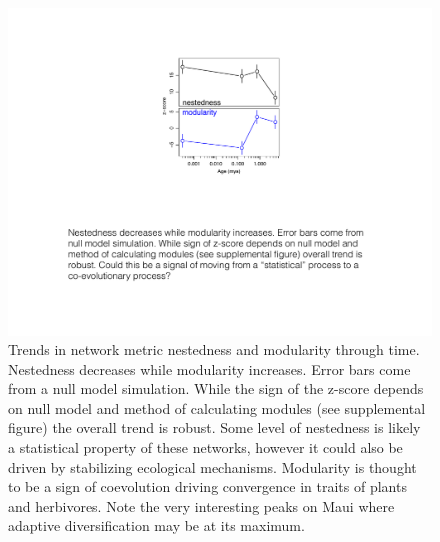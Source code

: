 \documentclass[12pt]{article}
\begin{document}
\begin{linenumbers}
\begin{figure}[!hp]
  \centering
  \includegraphics[scale=1]{fig_netMets.pdf} 
  \caption{Trends in network metric nestedness and modularity through
    time. Nestedness decreases while modularity increases. Error bars
    come from a null model simulation. While the sign of the z-score
    depends on null model and method of calculating modules (see
    supplemental figure) the overall trend is robust. Some level of
    nestedness is likely a statistical property of these networks,
    however it could also be driven by stabilizing ecological
    mechanisms. Modularity is thought to be a sign of coevolution
    driving convergence in traits of plants and herbivores. Note the
    very interesting peaks on Maui where adaptive diversification may
    be at its maximum.}
  \label{fig:netMet}
\end{figure}



\end{linenumbers}
\end{document}
